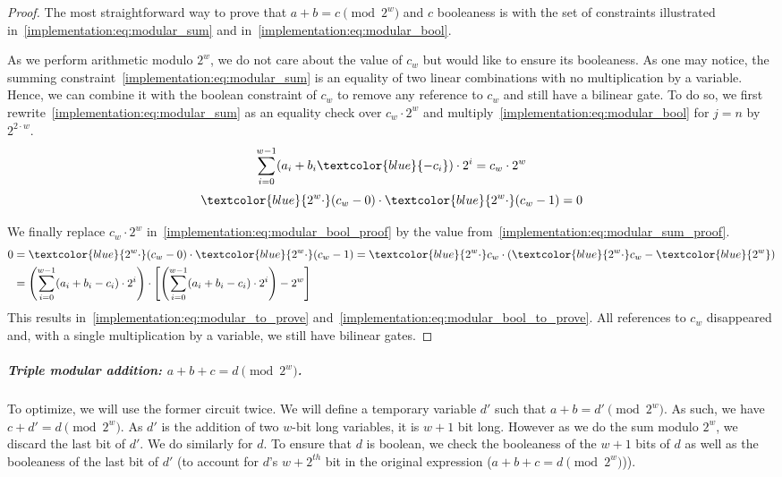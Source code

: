 \begin{proof}
The most straightforward way to prove that $a+b=c \pmod{2^w}$ and $c$ booleaness is with the set of constraints illustrated in~\cref{implementation:eq:modular_sum} and in~\cref{implementation:eq:modular_bool}.

As we perform arithmetic modulo $2^w$, we do not care about the value of $c_w$ but would like to ensure its booleaness. As one may notice, the summing constraint~\cref{implementation:eq:modular_sum} is an equality of two linear combinations with no multiplication by a variable. Hence, we can combine it with the boolean constraint of $c_w$ to remove any reference to $c_w$ and still have a bilinear gate. To do so, we first rewrite~\cref{implementation:eq:modular_sum} as an equality check over $c_{w}\cdot 2^{w}$ and multiply~\cref{implementation:eq:modular_bool} for $j=n$ by $2^{2\cdot w}$.
\begin{equation}
  \label{implementation:eq:modular_sum_proof}
  \sum_{i=0}^{w - 1} ( a_i + b_i \textcolor{blue}{- c_i}) \cdot 2^i = c_{w} \cdot 2^w
\end{equation}
\begin{equation}
  \label{implementation:eq:modular_bool_proof}
  \textcolor{blue}{2^w \cdot} (c_w - 0) \cdot \textcolor{blue}{2^w \cdot} (c_w - 1)= 0
\end{equation}

We finally replace $c_w \cdot 2^w$ in~\cref{implementation:eq:modular_bool_proof} by the value from~\cref{implementation:eq:modular_sum_proof}.
\begin{align*}
  0 &= \textcolor{blue}{2^w \cdot} (c_w - 0) \cdot \textcolor{blue}{2^w \cdot} (c_w - 1) = \textcolor{blue}{2^w \cdot} c_w \cdot (\textcolor{blue}{2^w \cdot} c_w - \textcolor{blue}{2^w})\\
  &= \left ( \sum_{i=0}^{w - 1} ( a_i + b_i - c_i ) \cdot 2^i \right ) \cdot \left [ \left (\sum_{i=0}^{w - 1} ( a_i + b_i - c_i ) \cdot 2^i \right ) - 2^w \right ]\\
\end{align*}
This results in~\cref{implementation:eq:modular_to_prove} and~\cref{implementation:eq:modular_bool_to_prove}. All references to $c_w$ disappeared and, with a single multiplication by a variable, we still have bilinear gates.\end{proof}

\subparagraph{Triple modular addition: {\boldmath $a + b + c = d \pmod {2^w}$}.}

To optimize, we will use the former circuit twice. We will define a temporary variable $d'$ such that $a+b = d' \pmod {2^w}$. As such, we have $c+d'= d \pmod {2^w}$. As $d'$ is the addition of two $w$-bit long variables, it is $w+1$ bit long. However as we do the sum modulo $2^w$, we discard the last bit of $d'$. We do similarly for $d$.
To ensure that $d$ is boolean, we check the booleaness of the $w+1$ bits of $d$ as well as the booleaness of the last bit of $d'$ (to account for $d$'s ${w+2}^{th}$ bit in the original expression ($a + b + c = d \pmod {2^w}$)).

